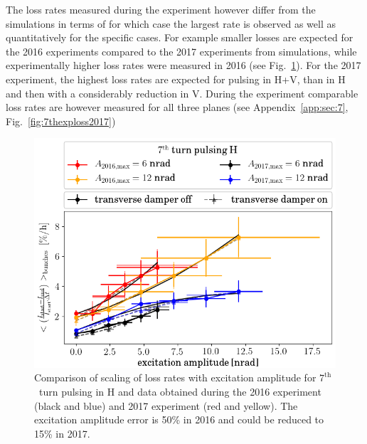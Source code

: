 \documentclass[%
 reprint,
 amsmath,amssymb,
 aps,
prstab,
]{revtex4-1}
\begin{document}
The loss rates measured during the experiment however differ from the simulations in terms of for which case the largest rate is observed as well as quantitatively for the specific cases. For example smaller losses are expected for the 2016 experiments compared to the 2017 experiments from simulations, while experimentally higher loss rates were measured in 2016 (see Fig.~\ref{fig:7thexploss}). For the 2017 experiment, the highest loss rates are expected for pulsing in H+V, than in H and then with a considerably reduction in V. During the experiment comparable loss rates are however measured for all three planes (see Appendix~\ref{app:sec:7}, Fig.~\ref{fig:7thexploss2017})
\begin{figure}[h]
	\centering
	\includegraphics[width=0.8\linewidth]{2016+2017_scale_amp_7h_lbllong.png}
	\caption{\label{fig:7thexploss} Comparison of scaling of loss rates with excitation amplitude for $7^{\mathrm{th}}$~turn pulsing in H and data obtained during the 2016 experiment (black and blue) and 2017 experiment (red and yellow). The excitation amplitude error is 50\% in 2016 and could be reduced to 15\% in 2017.}
\end{figure}
\end{document}
